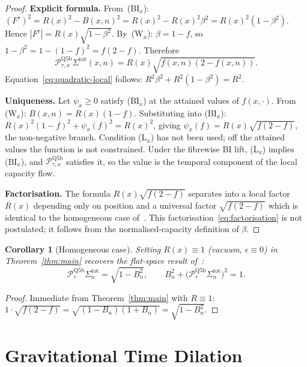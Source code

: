 \documentclass[11pt,a4paper]{article}
\newtheorem{corollary}[theorem]{Corollary}
\begin{document}
    \begin{proof}
      \textbf{Explicit formula.}
      From~(BI$_x$): $(F^\tau)^2 = R(x)^2 - B(x,n)^2 = R(x)^2 - R(x)^2\beta^2
      = R(x)^2(1-\beta^2)$.
      Hence $|F^\tau| = R(x)\sqrt{1-\beta^2}$.
      By~(W$_x$): $\beta = 1-f$, so $1-\beta^2 = 1-(1-f)^2 = f(2-f)$.
      Therefore
      \[
        \mathcal{P}_{\tau,x}^{\mathrm{Q5b}}\Sigma^{\mathrm{tot}}(x,n)
        = R(x)\sqrt{f(x,n)(2-f(x,n))}.
      \]
      Equation~\eqref{eq:quadratic-local} follows: $R^2\beta^2 + R^2(1-\beta^2) = R^2$.

      \textbf{Uniqueness.}
      Let $\psi_x \ge 0$ satisfy (BI$_x$) at the attained values of $f(x,\cdot)$.
      From (W$_x$): $B(x,n) = R(x)(1-f)$.
      Substituting into (BI$_x$): $R(x)^2(1-f)^2 + \psi_x(f)^2 = R(x)^2$, giving
      $\psi_x(f) = R(x)\sqrt{f(2-f)}$, the non-negative branch.
      Condition (L$_x$) has not been used; off the attained values the function is not constrained.
      Under the fibrewise BI lift, (L$_x$) implies (BI$_x$), and $\mathcal{P}_{\tau,x}^{\mathrm{Q5b}}$ satisfies it,
      so the value is the temporal component of the local capacity flow.

      \textbf{Factorisation.}
      The formula $R(x)\sqrt{f(2-f)}$ separates into a local factor $R(x)$ depending only
      on position and a universal factor $\sqrt{f(2-f)}$ which is identical to the
      homogeneous case of~\cite{Beau2026tp}.
      This factorisation~\eqref{eq:factorisation} is not postulated; it follows from the
      normalised-capacity definition of $\beta$.
    \end{proof}

    \begin{corollary}[Homogeneous case]\label{cor:homogeneous}
      Setting $R(x) \equiv 1$ (vacuum, $\epsilon \equiv 0$) in Theorem~\ref{thm:main}
      recovers the flat-space result of~\cite{Beau2026tp}:
      \[
        \mathcal{P}_\tau^{\mathrm{Q5b}}\Sigma_n^{\mathrm{tot}} = \sqrt{1-B_n^2},
        \qquad
        B_n^2 + \bigl(\mathcal{P}_\tau^{\mathrm{Q5b}}\Sigma_n^{\mathrm{tot}}\bigr)^2 = 1.
      \]
    \end{corollary}

    \begin{proof}
      Immediate from Theorem~\ref{thm:main} with $R\equiv 1$:
      $1\cdot\sqrt{f(2-f)} = \sqrt{(1-B_n)(1+B_n)} = \sqrt{1-B_n^2}$.
    \end{proof}

  \section{Gravitational Time Dilation}\label{sec:timedil}
\end{document}
